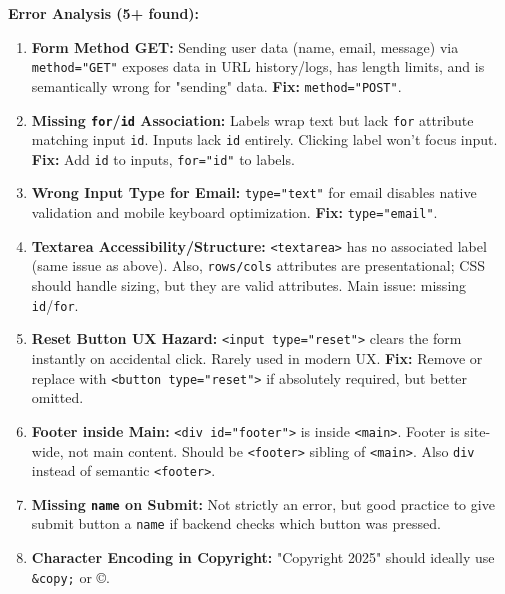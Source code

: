 \documentclass[11pt]{article}
\begin{document}
\begin{exoresolu}
\textbf{Error Analysis (5+ found):}

\begin{enumerate}
    \item \textbf{Form Method GET:} Sending user data (name, email, message) via \texttt{method="GET"} exposes data in URL history/logs, has length limits, and is semantically wrong for "sending" data. \textbf{Fix:} \texttt{method="POST"}.
    \item \textbf{Missing \texttt{for}/\texttt{id} Association:} Labels wrap text but lack \texttt{for} attribute matching input \texttt{id}. Inputs lack \texttt{id} entirely. Clicking label won't focus input. \textbf{Fix:} Add \texttt{id} to inputs, \texttt{for="id"} to labels.
    \item \textbf{Wrong Input Type for Email:} \texttt{type="text"} for email disables native validation and mobile keyboard optimization. \textbf{Fix:} \texttt{type="email"}.
    \item \textbf{Textarea Accessibility/Structure:} \texttt{<textarea>} has no associated label (same issue as above). Also, \texttt{rows/cols} attributes are presentational; CSS should handle sizing, but they are valid attributes. Main issue: missing \texttt{id}/\texttt{for}.
    \item \textbf{Reset Button UX Hazard:} \texttt{<input type="reset">} clears the form instantly on accidental click. Rarely used in modern UX. \textbf{Fix:} Remove or replace with \texttt{<button type="reset">} if absolutely required, but better omitted.
    \item \textbf{Footer inside Main:} \texttt{<div id="footer">} is inside \texttt{<main>}. Footer is site-wide, not main content. Should be \texttt{<footer>} sibling of \texttt{<main>}. Also \texttt{div} instead of semantic \texttt{<footer>}.
    \item \textbf{Missing \texttt{name} on Submit:} Not strictly an error, but good practice to give submit button a \texttt{name} if backend checks which button was pressed.
    \item \textbf{Character Encoding in Copyright:} "Copyright 2025" should ideally use \texttt{\&copy;} or ©.
\end{enumerate}


\end{exoresolu}
\end{document}
